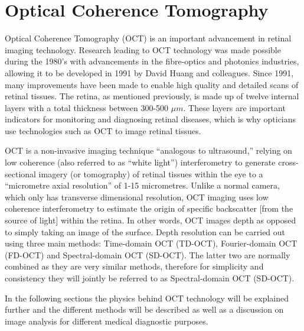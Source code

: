 \chapter{Optical Coherence Tomography}

\label{optical_coherence_tomography}

Optical Coherence Tomography (OCT) is an important advancement in retinal imaging
technology.  Research leading to OCT technology was made possible during the
1980’s with advancements in the fibre-optics and photonics industries, allowing it to be
developed in 1991 by David Huang and colleagues.\cite{mbib_1,mbib_2,mbib_3} 
Since 1991, many improvements have been made to enable high quality and detailed 
scans of retinal tissues.  The retina, as mentioned previously, is made up of twelve
internal layers with a total thickness between 300-500 $\mu m$.\cite{mbib_4}
These layers are important indicators for monitoring and diagnosing retinal diseases,
which is why opticians use technologies such as OCT to image retinal tissues.

OCT is a non-invasive imaging technique “analogous to ultrasound,” relying on low 
coherence (also referred to as “white light”) interferometry to generate cross-sectional
imagery (or tomography) of retinal tissues within the eye to a “micrometre axial
resolution” of 1-15 micrometres.\cite{mbib_5, mbib_6,mbib_2} Unlike a normal camera,
which only has transverse dimensional resolution, OCT imaging uses low coherence
interferometry to estimate the origin of specific backscatter [from the source of light]
within the retina.\cite{mbib_4}  In other words, OCT images depth as opposed to simply
taking an image of the surface.  Depth resolution can be carried out using three main
methods: Time-domain OCT (TD-OCT), Fourier-domain OCT (FD-OCT) and
Spectral-domain OCT (SD-OCT).  The latter two are normally combined as they are very
similar methods, therefore for simplicity and consistency they will jointly be referred to as
Spectral-domain OCT (SD-OCT).

In the following sections the physics behind OCT technology will be explained further
and the different methods will be described as well as a discussion on image analysis for
different medical diagnostic purposes.

